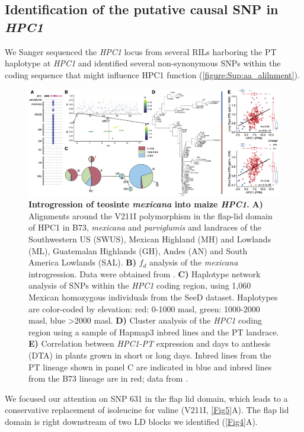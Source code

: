 \documentclass[9pt,twocolumn,twoside,lineno]{biorxiv}
\newcommand{\mex}{\textit{mexicana}\xspace}
\newcommand{\hpc}{\textit{HPC1}\xspace}
\newcommand{\parv}{\textit{parviglumis}\xspace}
\begin{document}
\subsection{Identification of the putative causal SNP in \hpc}
We Sanger sequenced the \hpc locus from several RILs harboring the PT haplotype at \hpc and identified several non-synonymous SNPs within the coding sequence that might influence HPC1 function (\cref{figure:Sup:aa_alilnment}).
\begin{figure}[!ht]
\includegraphics[width=0.8\paperwidth]{Figures/Fig_6.png}
\caption{\textbf{Introgression of teosinte \mex into maize \hpc.}  
\textbf{A)} Alignments around the V211I polymorphism in the flap-lid domain of HPC1 in B73, \mex and \parv and landraces of the Southwestern US (SWUS), Mexican Highland (MH) and Lowlands (ML), Guatemalan Highlands (GH), Andes (AN) and South America Lowlands (SAL).
\textbf{B)} \(f_d\) analysis of the \mex introgression. Data were obtained from \cite{Gonzalez-Segovia2019-jy}. 
\textbf{C)} Haplotype network analysis of SNPs within the \hpc coding region, using 1,060 Mexican homozygous individuals from the SeeD dataset. Haplotypes are color-coded by elevation: red: 0-1000 masl, green: 1000-2000 masl, blue >2000 masl.
\textbf{D)} Cluster analysis of the \hpc coding region using a sample of Hapmap3 inbred lines and the PT landrace.
\textbf{E)} Correlation between \textit{HPC1-PT} expression and days to anthesis (DTA) in plants grown in short or long days. 
Inbred lines from the PT lineage shown in panel C are indicated in blue and inbred lines from the B73 lineage are in red;
data from \cite{Kremling2018-gn}.}
\label{Fig6}
\end{figure}
We focused our attention on SNP 631 in the flap lid domain, which leads to a conservative replacement of isoleucine for valine (V211I, \cref{Fig5}A).  
The flap lid domain is right downstream of two LD blocks we identified (\cref{Fig4}A). 
\end{document}
